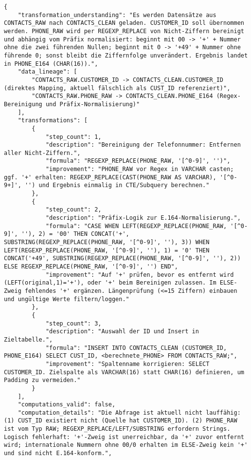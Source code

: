 \begin{lstlisting}[caption={Ausgabe: GPT-5 Anwendungsfall 3 Hauptdurchlauf},label={gpt_case3_prompt1}]
{
    "transformation_understanding": "Es werden Datensätze aus CONTACTS_RAW nach CONTACTS_CLEAN geladen. CUSTOMER_ID soll übernommen werden. PHONE_RAW wird per REGEXP_REPLACE von Nicht-Ziffern bereinigt und abhängig vom Präfix normalisiert: beginnt mit 00 -> '+' + Nummer ohne die zwei führenden Nullen; beginnt mit 0 -> '+49' + Nummer ohne führende 0; sonst bleibt die Ziffernfolge unverändert. Ergebnis landet in PHONE_E164 (CHAR(16)).",
    "data_lineage": [
        "CONTACTS_RAW.CUSTOMER_ID -> CONTACTS_CLEAN.CUSTOMER_ID (direktes Mapping, aktuell fälschlich als CUST_ID referenziert)",
        "CONTACTS_RAW.PHONE_RAW -> CONTACTS_CLEAN.PHONE_E164 (Regex-Bereinigung und Präfix-Normalisierung)"
    ],
    "transformations": [
        {
            "step_count": 1,
            "description": "Bereinigung der Telefonnummer: Entfernen aller Nicht-Ziffern.",
            "formula": "REGEXP_REPLACE(PHONE_RAW, '[^0-9]', '')",
            "improvement": "PHONE_RAW vor Regex in VARCHAR casten; ggf. '+' erhalten: REGEXP_REPLACE(CAST(PHONE_RAW AS VARCHAR), '[^0-9+]', '') und Ergebnis einmalig in CTE/Subquery berechnen."
        },
        {
            "step_count": 2,
            "description": "Präfix-Logik zur E.164-Normalisierung.",
            "formula": "CASE WHEN LEFT(REGEXP_REPLACE(PHONE_RAW, '[^0-9]', ''), 2) = '00' THEN CONCAT('+', SUBSTRING(REGEXP_REPLACE(PHONE_RAW, '[^0-9]', ''), 3)) WHEN LEFT(REGEXP_REPLACE(PHONE_RAW, '[^0-9]', ''), 1) = '0' THEN CONCAT('+49', SUBSTRING(REGEXP_REPLACE(PHONE_RAW, '[^0-9]', ''), 2)) ELSE REGEXP_REPLACE(PHONE_RAW, '[^0-9]', '') END",
            "improvement": "Auf '+' prüfen, bevor es entfernt wird (LEFT(original,1)='+'), oder '+' beim Bereinigen zulassen. Im ELSE-Zweig fehlendes '+' ergänzen. Längenprüfung (<=15 Ziffern) einbauen und ungültige Werte filtern/loggen."
        },
        {
            "step_count": 3,
            "description": "Auswahl der ID und Insert in Zieltabelle.",
            "formula": "INSERT INTO CONTACTS_CLEAN (CUSTOMER_ID, PHONE_E164) SELECT CUST_ID, <berechnete_PHONE> FROM CONTACTS_RAW;",
            "improvement": "Spaltenname korrigieren: SELECT CUSTOMER_ID. Zielspalte als VARCHAR(16) statt CHAR(16) definieren, um Padding zu vermeiden."
        }
    ],
    "computations_valid": false,
    "computation_details": "Die Abfrage ist aktuell nicht lauffähig: (1) CUST_ID existiert nicht (Quelle hat CUSTOMER_ID). (2) PHONE_RAW ist vom Typ RAW; REGEXP_REPLACE/LEFT/SUBSTRING erfordern Strings. Logisch fehlerhaft: '+'-Zweig ist unerreichbar, da '+' zuvor entfernt wird; internationale Nummern ohne 00/0 erhalten im ELSE-Zweig kein '+' und sind nicht E.164-konform.",

\end{lstlisting}
